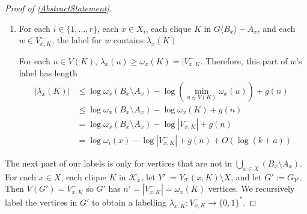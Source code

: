 \documentclass{patmorin}
\newcommand{\torso}[2]{{#1}\langle{#2}\rangle}
\renewcommand{\ge}{\geqslant}
\renewcommand{\le}{\leqslant}
\begin{document}
\begin{proof}[Proof of \cref{AbstractStatement}]
\begin{enumerate}[nosep,nolistsep,label=(P6\alph*)]
      \item\label{dejmmw_part_b}\label{dejmmw_part_clique} For each $i\in\{1,\ldots,r\}$, each $x\in X_i$, each clique $K$ in $\torso{G}{B_x}-A_x$, and each $w\in V^-_{x,K}$, the label for $w$ contains $\lambda_x(K)$

      For each $u\in V(K)$, $\lambda_x(u)\ge\omega_x(K)=|V^-_{x,K}$. Therefore, this part of $w$'s label has length
      \begin{align*}
        |\lambda_x(K)| & \le \log \omega_x(B_x\setminus A_x)-\log\left(\min_{u\in V(K)}\omega_x(u)\right) + g(n) \\
        & \le \log \omega_x(B_x\setminus A_x)-\log\omega_x(K) + g(n) \\
        & = \log \omega_x(B_x\setminus A_x)-\log|V^-_{x,K}| + g(n) \\
        & = \log \omega_i(x)-\log |V^-_{x,K}| + g(n) +O(\log(k+a))
      \end{align*}
    \end{enumerate}

    The next part of our labels is only for vertices that are not in $\bigcup_{x\in X}(B_x\setminus A_x)$. For each $x\in X$, each clique $K$ in $\mathcal{K}_x$, let $Y':=Y_\mathcal{T}(x,K)\setminus X$, and let $G':=G_{Y'}$.  Then $V(G')=V^-_{x,K}$ so $G'$ has $n'=|V^-_{x,K}|=\omega_x(K)$ vertices.
    We recursively label the vertices in $G'$ to obtain a labelling $\lambda_{x,K}:V^-_{x,K}\to\{0,1\}^*$.


\end{proof}
\end{document}
